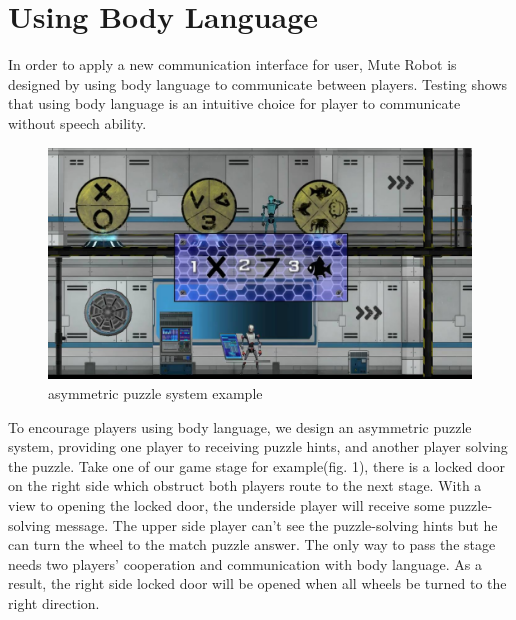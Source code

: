 \documentclass{chi-ext}
\begin{document}



\section{Using Body Language}
In order to apply a new communication interface for user, Mute Robot is designed by using body language to communicate between players. Testing shows that using body language is an intuitive choice for player to communicate without speech ability.

\begin{figure}
  \centering
  \includegraphics[width=\linewidth]{figures/Figure1.jpg}
  \caption{asymmetric puzzle system example}
  \label{fig:Figure1}
\end{figure}

To encourage players using body language, we design an asymmetric puzzle system, providing one player to receiving puzzle hints, and another player solving the puzzle. Take one of our game stage for example(fig. 1), there is a locked door on the right side which obstruct both players route to the next stage. With a view to opening the locked door, the underside player will receive some puzzle-solving message. The upper side player can't see the puzzle-solving hints but he can turn the wheel to the match puzzle answer. The only way to pass the stage needs two players' cooperation and communication with body language. As a result, the right side locked door will be opened when all wheels be turned to the right direction.

\end{document}
